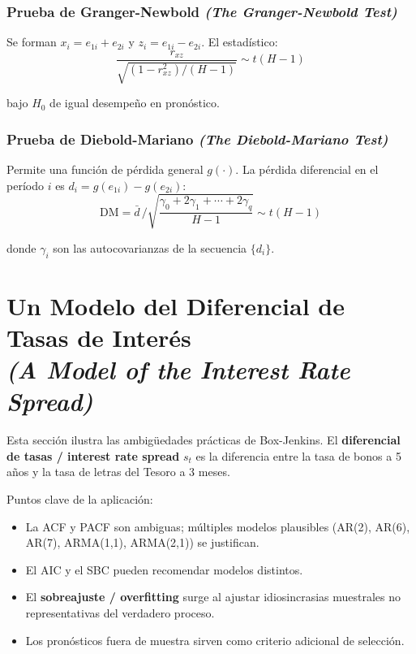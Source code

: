 \documentclass[12pt]{article}
\begin{document}
\subsubsection{Prueba de Granger-Newbold \textit{(The Granger-Newbold Test)}}

Se forman $x_i = e_{1i} + e_{2i}$ y $z_i = e_{1i} - e_{2i}$. El estad\'istico:
\begin{equation}
\frac{r_{xz}}{\sqrt{(1-r_{xz}^2)/(H-1)}}
  \sim t(H-1)
\end{equation}

bajo $H_0$ de igual desempe\~no en pron\'ostico.

\subsubsection{Prueba de Diebold-Mariano \textit{(The Diebold-Mariano Test)}}

Permite una funci\'on de p\'erdida general $g(\cdot)$. La p\'erdida diferencial en el per\'iodo $i$ es $d_i = g(e_{1i}) - g(e_{2i})$:
\begin{equation}
\text{DM} = \bar{d}\,\Big/\sqrt{\frac{\gamma_0 + 2\gamma_1 + \cdots + 2\gamma_q}{H-1}}
  \sim t(H-1)
\end{equation}

donde $\gamma_i$ son las autocovarianzas de la secuencia $\{d_i\}$.

\section{Un Modelo del Diferencial de Tasas de Inter\'es\\
\textit{(A Model of the Interest Rate Spread)}}

Esta secci\'on ilustra las ambig\"uedades pr\'acticas de Box-Jenkins. El \textbf{diferencial de tasas / interest rate spread} $s_t$ es la diferencia entre la tasa de bonos a 5 a\~nos y la tasa de letras del Tesoro a 3 meses.

Puntos clave de la aplicaci\'on:
\begin{itemize}
  \item La ACF y PACF son ambiguas; m\'ultiples modelos plausibles (AR(2), AR(6), AR(7), ARMA(1,1), ARMA(2,1)) se justifican.
  \item El AIC y el SBC pueden recomendar modelos distintos.
  \item El \textbf{sobreajuste / overfitting} surge al ajustar idiosincrasias muestrales no representativas del verdadero proceso.
  \item Los pron\'osticos fuera de muestra sirven como criterio adicional de selecci\'on.
\end{itemize}
\end{document}
